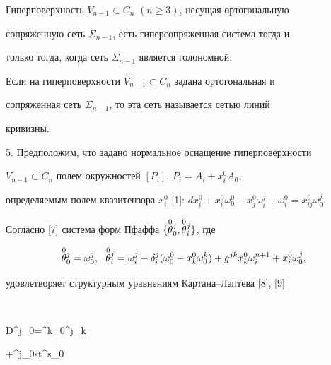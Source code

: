  


 


\begin{thm} 


Гиперповерхность $V_{n-1}\subset C_n$ $(n\ge3)$, несущая ортогональную 


сопряженную сеть $\Sigma_{n-1}$, есть гиперсопряженная система тогда и 


только тогда, когда сеть $\Sigma_{n-1}$ является голономной. 


\end{thm} 


 


Если на гиперповерхности $V_{n-1}\subset C_n$ задана ортогональная и 


сопряженная сеть $\Sigma_{n-1}$, то эта сеть называется сетью линий 


кривизны. 


\medskip 


 


5. Предположим, что задано нормальное оснащение гиперповерхности 


$V_{n-1}\subset C_n$ полем окружностей $[P_i]$, $P_i=A_i+x^0_i A_0$, 


определяемым полем квазитензора $x^0_i$ [1]: $dx^0_i+x^0_i\omega^0_0 


-x^0_j\omega^j_i+\omega^0_i=x^0_{ij}\omega^j_0$. 


 


Согласно [7] система форм Пфаффа $\{\up{0}{\theta}^j_0, 


\up{0}{\theta}^j_i\}$, где 


\begin{equation} 


\up{0}{\theta}^j_0=\omega^j_0,\ \ \up{0}{\theta}^j_i= 


\omega^j_i-\delta^j_i(\omega^0_0-x^0_k \omega^k_0)+ 


g^{jk}x^0_k \omega^{n+1}_i+x^0_i \omega^j_0, 


\end{equation} 


удовлетворяет структурным уравнениям Картана--Лаптева [8], [9] 


$$ 


D^j_0=^k_0\wedge{}^j_k 


+^j_{0st}^s_0\wedge 


